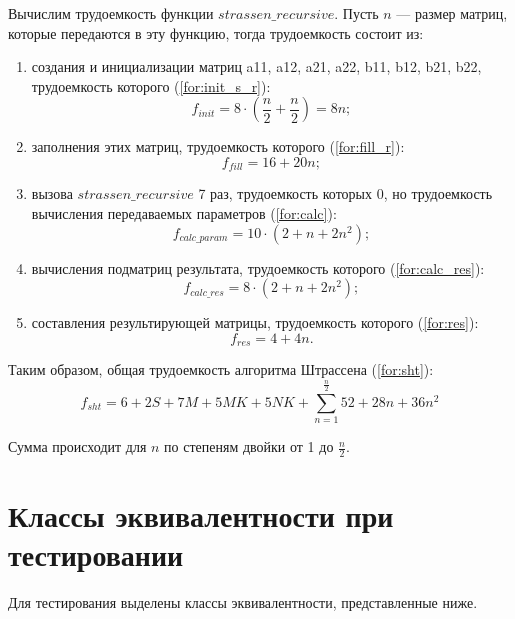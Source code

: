 Вычислим трудоемкость функции $strassen\_recursive$. Пусть $n$ --- размер матриц, которые передаются в эту функцию, тогда трудоемкость состоит из:
\begin{enumerate}[label=\arabic*)]
	\item создания и инициализации матриц a11, a12, a21, a22, b11, b12, b21, b22, трудоемкость которого (\ref{for:init_s_r}):
	\begin{equation}
		\label{for:init_s_r}
		f_{init} = 8 \cdot (\frac{n}{2} + \frac{n}{2}) = 8n;
	\end{equation}
	\item заполнения этих матриц, трудоемкость которого (\ref{for:fill_r}):
	\begin{equation}
		\label{for:fill_r}
		f_{fill} = 16 + 20n;
	\end{equation}
	\item вызова $strassen\_recursive$ 7 раз, трудоемкость которых 0, но трудоемкость вычисления передаваемых параметров (\ref{for:calc}):
	\begin{equation}
		\label{for:calc}
		f_{calc\_param} = 10 \cdot (2 + n + 2n^2);
	\end{equation}
	\item вычисления подматриц результата, трудоемкость которого (\ref{for:calc_res}):
	\begin{equation}
		\label{for:calc_res}
		f_{calc\_res} = 8 \cdot (2 + n + 2n^2);
	\end{equation}
	\item составления результирующей матрицы, трудоемкость которого (\ref{for:res}):
	\begin{equation}
		\label{for:res}
		f_{res} = 4 + 4n.
	\end{equation}
\end{enumerate}

Таким образом, общая трудоемкость алгоритма Штрассена (\ref{for:sht}):
\begin{equation}
	\label{for:sht}
	f_{sht} = 6 + 2S + 7M + 5MK + 5NK + \sum_{n=1}^{\frac{n}{2}}{52 + 28n + 36n^2}
\end{equation}

Сумма происходит для $n$ по степеням двойки от 1 до $\frac{n}{2}$.

\section{Классы эквивалентности при тестировании}

Для тестирования выделены классы эквивалентности, представленные ниже.

